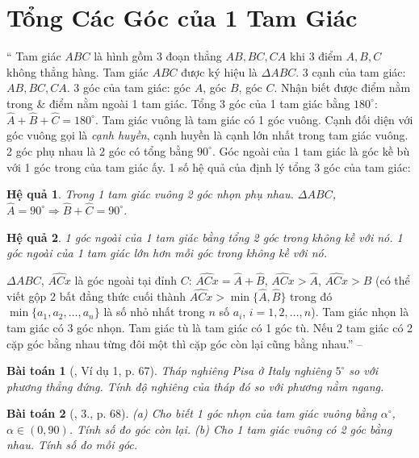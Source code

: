 \documentclass{article}
\newtheorem{baitoan}{Bài toán}
\newtheorem{hequa}{Hệ quả}
\begin{document}

\section{Tổng Các Góc của 1 Tam Giác}
`` Tam giác $ABC$ là hình gồm 3 đoạn thẳng $AB,BC,CA$ khi 3 điểm $A,B,C$ không thẳng hàng. Tam giác $ABC$ được ký hiệu là $\Delta ABC$. 3 cạnh của tam giác: $AB,BC,CA$. 3 góc của tam giác: góc $A$, góc $B$, góc $C$. Nhận biết được điểm nằm trong \& điểm nằm ngoài 1 tam giác.  Tổng 3 góc của 1 tam giác bằng $180^\circ$: $\widehat{A} + \widehat{B} + \widehat{C} = 180^\circ$.  Tam giác vuông là tam giác có 1 góc vuông. Cạnh đối diện với góc vuông gọi là \textit{cạnh huyền}, cạnh huyền là cạnh lớn nhất trong tam giác vuông. 2 góc phụ nhau là 2 góc có tổng bằng $90^\circ$. Góc ngoài của 1 tam giác là góc kề bù với 1 góc trong của tam giác ấy.  1 số hệ quả của định lý tổng 3 góc của tam giác:

\begin{hequa}
	Trong 1 tam giác vuông 2 góc nhọn phụ nhau. $\Delta ABC$, $\widehat{A} = 90^\circ\Rightarrow\widehat{B} + \widehat{C} = 90^\circ$.
\end{hequa}

\begin{hequa}
	1 góc ngoài của 1 tam giác bằng tổng 2 góc trong không kề với nó. 1 góc ngoài của 1 tam giác lớn hơn mỗi góc trong không kề với nó.
\end{hequa}
$\Delta ABC$, $\widehat{ACx}$ là góc ngoài tại đỉnh $C$: $\widehat{ACx} = \widehat{A} + \widehat{B}$, $\widehat{ACx} > \widehat{A}$, $\widehat{ACx} > \widehat{B}$ (có thể viết gộp 2 bất đẳng thức cuối thành $\widehat{ACx} > \min\{\widehat{A},\widehat{B}\}$ trong đó $\min\{a_1,a_2,\ldots,a_n\}$ là số nhỏ nhất trong $n$ số $a_i$, $i = 1,2,\ldots,n$).  Tam giác nhọn là tam giác có 3 góc nhọn. Tam giác tù là tam giác có 1 góc tù. Nếu 2 tam giác có 2 cặp góc bằng nhau từng đôi một thì cặp góc còn lại cũng bằng nhau.'' -- \cite[Chap. IV, \S1, p.65]{Tuyen_Toan_7}

\begin{baitoan}[\cite{SBT_Toan_7_Canh_Dieu_tap_2}, Ví dụ 1, p. 67]
	Tháp nghiêng Pisa ở Italy nghiêng $5^\circ$ so với phương thẳng đứng. Tính độ nghiêng của tháp đó so với phương nằm ngang.
\end{baitoan}

\begin{baitoan}[\cite{SBT_Toan_7_Canh_Dieu_tap_2}, 3., p. 68]
	(a) Cho biết 1 góc nhọn của tam giác vuông bằng $\alpha^\circ$, $\alpha\in(0,90)$. Tính số đo góc còn lại. (b) Cho 1 tam giác vuông có 2 góc bằng nhau. Tính số đo mỗi góc.
\end{baitoan}
\end{document}
